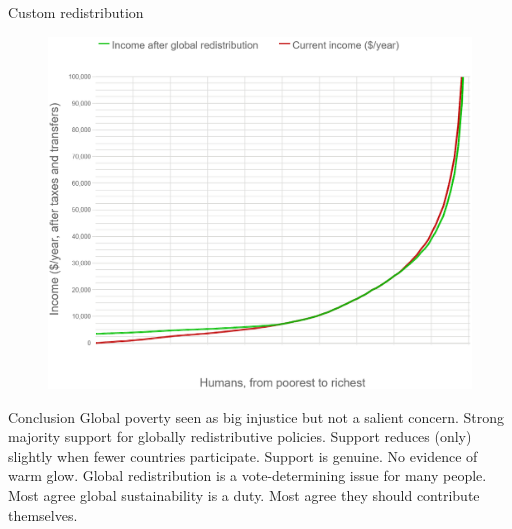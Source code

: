 \documentclass[aspectratio=169,xcolor=dvipsnames, 11pt,mathserif]{beamer}
\begin{document}
\begin{frame}{Custom redistribution \href{run:../figures/questionnaire/survey_custom_redistr.mp4}{}}
{\begin{figure}
    \includegraphics[height=.83\textheight]{../figures/questionnaire/survey_custom_redistr_median_zoom.png}\end{figure}}
\end{frame}

\begin{frame}{Conclusion}
\bbs
\ip Global poverty seen as big injustice but not a salient concern.
\ip Strong majority support for globally redistributive policies.
\ip Support reduces (only) slightly when fewer countries participate.
\ip Support is genuine. No evidence of warm glow.
\ip Global redistribution is a vote-determining issue for many people. %
\ip Most agree global sustainability is a duty.
\ip Most agree they should contribute themselves.
\ee
\end{frame}

\end{document}
